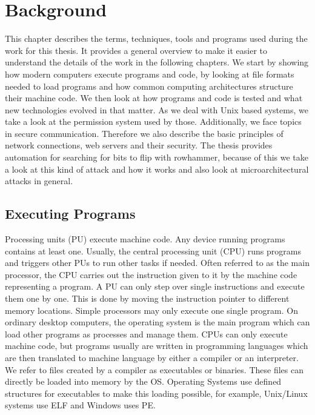 \chapter{Background}\label{sec:general}

This chapter describes the terms, techniques, tools and programs used during the
work for this thesis. It provides a general overview to make it easier to
understand the details of the work in the following chapters. We start by
showing how modern computers execute programs and code, by looking at file
formats needed to load programs and how common computing architectures structure
their machine code. We then look at how programs and code is tested and what new
technologies evolved in that matter. As we deal with Unix based systems, we take
a look at the permission system used by those.
Additionally, we face topics in secure communication. Therefore we also describe
the basic principles of network connections, web servers and their security. The
thesis provides automation for searching for bits to flip with rowhammer,
because of this we take a look at this kind of attack and how it works and also
look at microarchitectural attacks in general.

\section{Executing Programs}

Processing units (PU) execute machine code. Any device running programs contains
at least one. Usually, the central processing unit (CPU) runs programs and
triggers other PUs to run other tasks if needed. Often referred to as the main
processor, the CPU carries out the instruction given to it by the machine code
representing a program. A PU can only step over single instructions and execute
them one by one. This is done by moving the instruction pointer to different
memory locations. Simple processors may only execute one single program. On
ordinary desktop computers, the operating system is the main program which can
load other programs as processes and manage them. CPUs can only execute machine
code, but programs usually are written in programming languages which are then
translated to machine language by either a compiler or an interpreter. We refer
to files created by a compiler as executables or binaries. These files can
directly be loaded into memory by the OS. Operating Systems use defined
structures for executables to make this loading possible, for example,
Unix/Linux systems use ELF and Windows uses PE.

